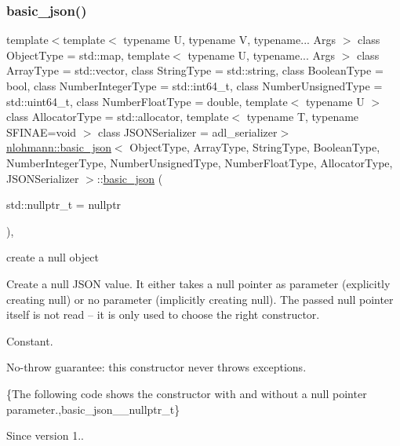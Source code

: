 \subsubsection{\texorpdfstring{basic\+\_\+json()}{basic\_json()}\hspace{0.1cm}{\footnotesize\ttfamily [2/9]}}
{\footnotesize\ttfamily template$<$template$<$ typename U, typename V, typename... Args $>$ class Object\+Type = std\+::map, template$<$ typename U, typename... Args $>$ class Array\+Type = std\+::vector, class String\+Type  = std\+::string, class Boolean\+Type  = bool, class Number\+Integer\+Type  = std\+::int64\+\_\+t, class Number\+Unsigned\+Type  = std\+::uint64\+\_\+t, class Number\+Float\+Type  = double, template$<$ typename U $>$ class Allocator\+Type = std\+::allocator, template$<$ typename T, typename S\+F\+I\+N\+A\+E=void $>$ class J\+S\+O\+N\+Serializer = adl\+\_\+serializer$>$ \\
\mbox{\hyperlink{classnlohmann_1_1basic__json}{nlohmann\+::basic\+\_\+json}}$<$ Object\+Type, Array\+Type, String\+Type, Boolean\+Type, Number\+Integer\+Type, Number\+Unsigned\+Type, Number\+Float\+Type, Allocator\+Type, J\+S\+O\+N\+Serializer $>$\+::\mbox{\hyperlink{classnlohmann_1_1basic__json}{basic\+\_\+json}} (\begin{DoxyParamCaption}\item[{std\+::nullptr\+\_\+t}]{ = {\ttfamily nullptr} }\end{DoxyParamCaption})\hspace{0.3cm}{\ttfamily [inline]}, {\ttfamily [noexcept]}}



create a null object 

Create a {\ttfamily null} J\+S\+ON value. It either takes a null pointer as parameter (explicitly creating {\ttfamily null}) or no parameter (implicitly creating {\ttfamily null}). The passed null pointer itself is not read -- it is only used to choose the right constructor.

Constant.

No-\/throw guarantee\+: this constructor never throws exceptions.

\{The following code shows the constructor with and without a null pointer parameter.,basic\+\_\+json\+\_\+\+\_\+nullptr\+\_\+t\}

\begin{DoxySince}{Since}
version 1.. 
\end{DoxySince}
\mbox{\label{classnlohmann_1_1basic__json_a5a6558bfd1be139a638f91f0e09fc737}} 
